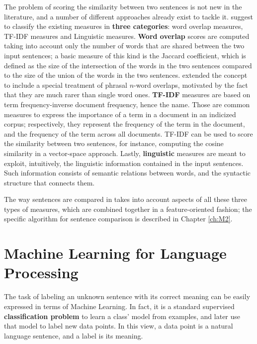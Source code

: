 The problem of scoring the similarity between two sentences is not new in the literature, and a number of different approaches already exist to tackle it. \cite{Achananuparp:2008:ESS:1430555.1430594} suggest to classify the existing measures in \textbf{three categories}: word overlap measures, TF-IDF measures and Linguistic measures. \textbf{Word overlap} scores are computed taking into account only the number of words that are shared between the two input sentences; a basic measure of this kind is the Jaccard coefficient, which is defined as the size of the intersection of the words in the two sentences compared to the size of the union of the words in the two sentences. \cite{Banerjee03extendedgloss} extended the concept to include a special treatment of phrasal $n$-word overlaps, motivated by the fact that they are much rarer than single word ones. \textbf{TF-IDF} measures are based on term frequency-inverse document frequency, hence the name. Those are common measures to express the importance of a term in a document in an  indicized corpus; respectively, they represent the frequency of the term in the document, and the frequency of the term across all documents. TF-IDF can be used to score the similarity between two sentences, for instance, computing the cosine similarity in a vector-space approach. Lastly, \textbf{linguistic} measures are meant to exploit, intuitively, the linguistic information contained in the input sentences. Such information consists of semantic relations between words, and the syntactic structure that connects them. %

The way sentences are compared in \pname takes into account aspects of all these three types of measures, which are combined together in a feature-oriented fashion; the specific algorithm for sentence comparison is described in Chapter \ref{ch:M2}.


\section{Machine Learning for Language Processing} \label{ch:rw:ml}
The task of labeling an unknown sentence with its correct meaning can be easily expressed in terms of Machine Learning. In fact, it is a standard supervised \textbf{classification problem} to learn a class' model from examples, and later use that model to label new data points. In this view, a data point is a natural language sentence, and a label is its meaning. 


